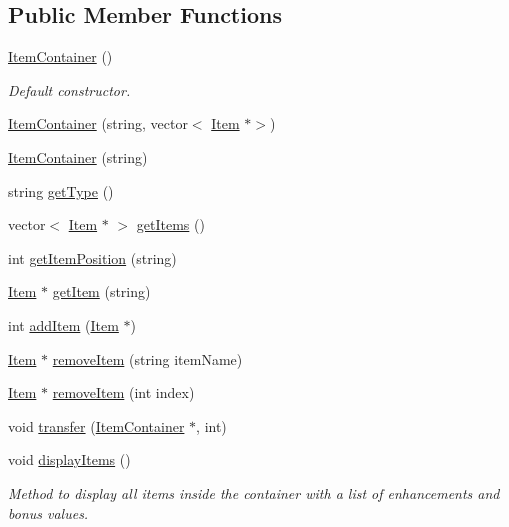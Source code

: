 \subsection*{Public Member Functions}
\begin{DoxyCompactItemize}
\item 
\hypertarget{class_item_container_a3ce79c8b4501fafc5ea369ef3b3c1bce}{}\label{class_item_container_a3ce79c8b4501fafc5ea369ef3b3c1bce} 
\hyperlink{class_item_container_a3ce79c8b4501fafc5ea369ef3b3c1bce}{Item\+Container} ()
\begin{DoxyCompactList}\small\item\em Default constructor. \end{DoxyCompactList}\item 
\hyperlink{class_item_container_ad899d6d3519f2bc7295d0627ebff3303}{Item\+Container} (string, vector$<$ \hyperlink{class_item}{Item} $\ast$$>$)
\item 
\hyperlink{class_item_container_a1bb504a29d6b13f124a9e10db665ffb8}{Item\+Container} (string)
\item 
string \hyperlink{class_item_container_a518fcd2c8f83876eee5dc45543101529}{get\+Type} ()
\item 
vector$<$ \hyperlink{class_item}{Item} $\ast$ $>$ \hyperlink{class_item_container_af3f935fb769b4ab37b0dc63d1ad68102}{get\+Items} ()
\item 
int \hyperlink{class_item_container_a8aba27005f95301bad0b64ac3c4c0a03}{get\+Item\+Position} (string)
\item 
\hyperlink{class_item}{Item} $\ast$ \hyperlink{class_item_container_a69484fdd0e4b6511a53a9040bc65bd7e}{get\+Item} (string)
\item 
int \hyperlink{class_item_container_a1e96e332b6bb271ad81fc944f7b63f82}{add\+Item} (\hyperlink{class_item}{Item} $\ast$)
\item 
\hyperlink{class_item}{Item} $\ast$ \hyperlink{class_item_container_ae8065460f5145a445b7b49048696ad6b}{remove\+Item} (string item\+Name)
\item 
\hyperlink{class_item}{Item} $\ast$ \hyperlink{class_item_container_a0bdcc60d80e57a9995b7e99adf09c15e}{remove\+Item} (int index)
\item 
void \hyperlink{class_item_container_a8d5e3ca4ab846703a764e10ba9d0d42d}{transfer} (\hyperlink{class_item_container}{Item\+Container} $\ast$, int)
\item 
\hypertarget{class_item_container_a4b71e50713900a2a305b914b80a34a19}{}\label{class_item_container_a4b71e50713900a2a305b914b80a34a19} 
void \hyperlink{class_item_container_a4b71e50713900a2a305b914b80a34a19}{display\+Items} ()
\begin{DoxyCompactList}\small\item\em Method to display all items inside the container with a list of enhancements and bonus values. \end{DoxyCompactList}\end{DoxyCompactItemize}
